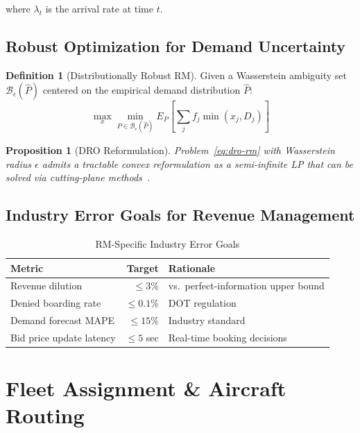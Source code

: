 \documentclass[11pt,a4paper]{book}
\newtheorem{proposition}[theorem]{Proposition}
\theoremstyle{definition}
\newtheorem{definition}[theorem]{Definition}
\begin{document}
where $\lambda_t$ is the arrival rate at time $t$.

\section{Robust Optimization for Demand Uncertainty}

\begin{definition}[Distributionally Robust RM]
Given a Wasserstein ambiguity set $\mathcal{B}_\epsilon(\hat{P})$ centered
on the empirical demand distribution $\hat{P}$:
\begin{equation}
  \max_{x} \min_{P \in \mathcal{B}_\epsilon(\hat{P})}
    E_P\left[\sum_j f_j \min(x_j, D_j)\right]
  \label{eq:dro-rm}
\end{equation}
\end{definition}

\begin{proposition}[DRO Reformulation]
Problem~\eqref{eq:dro-rm} with Wasserstein radius $\epsilon$ admits a
tractable convex reformulation as a semi-infinite LP that can be solved
via cutting-plane methods~\cite{Bertsimas2005}.
\end{proposition}

\section{Industry Error Goals for Revenue Management}

\begin{table}[h]
\centering
\caption{RM-Specific Industry Error Goals}
\label{tab:rm-goals}
\begin{tabular}{lrl}
\toprule
\textbf{Metric} & \textbf{Target} & \textbf{Rationale} \\
\midrule
Revenue dilution & $\leq 3\%$ & vs.\ perfect-information upper bound \\
Denied boarding rate & $\leq 0.1\%$ & DOT regulation \\
Demand forecast MAPE & $\leq 15\%$ & Industry standard \\
Bid price update latency & $\leq 5$ sec & Real-time booking decisions \\
\bottomrule
\end{tabular}
\end{table}


\chapter{Fleet Assignment \& Aircraft Routing}
\end{document}
